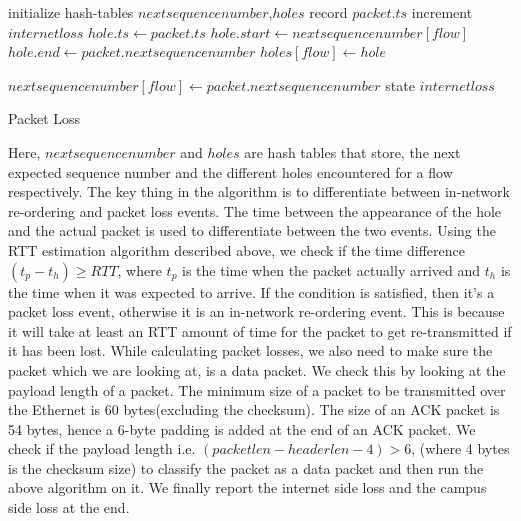 \begin{algorithm}[htpb]
\bigskip
\begin{algorithmic}
\State initialize hash-tables $nextsequencenumber$,$holes$ 
        \State record $packet.ts$
        \State increment $internetloss$
    \EndIf
\EndIf 
\EndFor
{} 
    \State $hole.ts \gets packet.ts$
    \State $hole.start \gets nextsequencenumber[flow]$
    \State $hole.end \gets packet.nextsequencenumber$
    \State $holes[flow] \gets hole$
\EndIf

$nextsequencenumber[flow] \gets packet.nextsequencenumber$
\EndFor
\State state $internetloss$
\end{algorithmic}
\caption[Packet Loss]{Packet Loss}
\label{alg:packet loss}
\bigskip
\end{algorithm}

Here, $nextsequencenumber$ and $holes$ are hash tables that store, the next expected sequence number and the different holes encountered for a flow respectively. The key thing in the algorithm is to differentiate between in-network re-ordering and packet loss events. The time between the appearance of the hole and the actual packet is used to differentiate between the two events. Using the RTT estimation algorithm described above, we check if the time difference \( (t_p - t_h) \geq  RTT \), where $t_p$ is the time when the packet actually arrived and $t_h$ is the time when it was expected to arrive. If the condition is satisfied, then it's a packet loss event, otherwise it is an in-network re-ordering event. This is because it will take at least an RTT amount of time for the packet to get re-transmitted if it has been lost. While calculating packet losses, we also need to make sure the packet which we are looking at, is a data packet. We check this by looking at the payload length of a packet. The minimum size of a packet to be transmitted over the Ethernet is 60 bytes(excluding the checksum). The size of an ACK packet is 54 bytes, hence a 6-byte padding is added at the end of an ACK packet. We check if the payload length i.e. \( (packetlen - headerlen - 4) > 6 \), (where 4 bytes is the checksum size) to classify the packet as a data packet and then run the above algorithm on it. We finally report the internet side loss and the campus side loss at the end.

